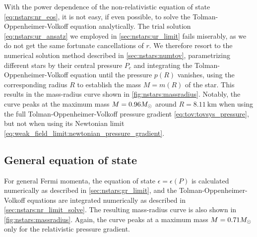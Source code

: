 With the power dependence of the non-relativistic equation of state \eqref{eq:nstars:nr_eos}, it is not easy, if even possible, to solve the Tolman-Oppenheimer-Volkoff equation analytically.
The trial solution \eqref{eq:nstars:ur_ansatz} we employed in \cref{sec:nstars:ur_limit} fails miserably, as we do not get the same fortunate cancellations of $r$.
We therefore resort to the numerical solution method described in \cref{sec:nstars:numtov}, parametrizing different stars by their central pressure $P_c$ and integrating the Tolman-Oppenheimer-Volkoff equation until the pressure $p(R)$ vanishes, using the corresponding radius $R$ to establish the mass $M = m(R)$ of the star.
This results in the mass-radius curve shown in \cref{fig:nstars:massradius}.
Notably, the curve peaks at the maximum mass $M = 0.96 M_\odot$ around $R = \SI{8.11}{\kilo\meter}$ when using the full Tolman-Oppenheimer-Volkoff pressure gradient \eqref{eq:tov:tovsys_pressure}, but not when using its Newtonian limit \eqref{eq:weak_field_limit:newtonian_pressure_gradient}.

\subsection{General equation of state}

For general Fermi momenta, the equation of state $\epsilon = \epsilon(P)$ is calculated numerically as described in \cref{sec:nstars:gr_limit}, and the Tolman-Oppenheimer-Volkoff equations are integrated numerically as described in \cref{sec:nstars:nr_limit_solve}.
The resulting mass-radius curve is also shown in \cref{fig:nstars:massradius}.
Again, the curve peaks at a maximum mass $M = 0.71 M_\odot$ only for the relativistic pressure gradient.

\pgfmathsetmacro{\maxRnr}{\pgfmathresult}
\pgfmathsetmacro{\maxRgr}{\pgfmathresult}

